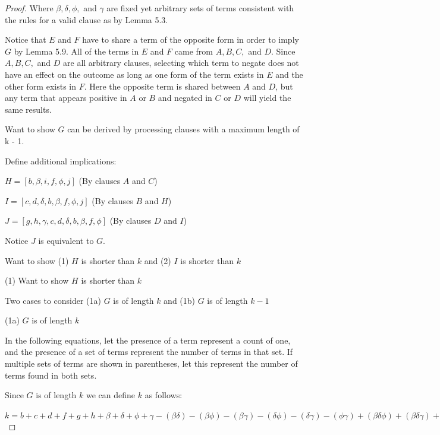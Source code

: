 \documentclass[manuscript]{acmart}
\begin{document}
\begin{proof}
        Where $\beta, \delta, \phi,$ and $\gamma$ are fixed yet arbitrary sets
        of terms consistent with the rules for a valid clause as by Lemma 5.3.

        Notice that $E$ and $F$ have to share a term of the opposite form
        in order to imply $G$ by Lemma 5.9. All of the terms in $E$ and $F$
        came from $A, B, C,$ and $D$.
        Since $A, B, C,$ and $D$ are
        all arbitrary clauses, selecting which term to negate does not
        have an effect on the outcome as long as one form of the term exists in $E$
        and the other form exists in $F$.
        Here the opposite term is shared 
        between $A$ and $D$, but any term that appears positive in $A$
        or $B$ and negated in $C$ or $D$ will yield the same results.
 
        Want to show $G$ can be derived by processing clauses with a 
        maximum length of k - 1.

        Define additional implications:

        $H = [b, \beta, i, f, \phi, j]$ (By clauses $A$ and $C$)

        $I = [c, d, \delta, b, \beta, f, \phi, j]$ (By clauses $B$ and $H$)

        $J = [g, h, \gamma, c, d, \delta, b, \beta, f, \phi]$ (By clauses $D$ and $I$)

        Notice $J$ is equivalent to $G$.

        Want to show (1) $H$ is shorter than $k$ and (2) $I$ is shorter than $k$

        (1) Want to show $H$ is shorter than $k$

        Two cases to consider (1a) $G$ is of length $k$ and (1b) $G$ is of length $k - 1$

        (1a) $G$ is of length $k$

        In the following equations, let the presence of a term represent a count of one,
        and the presence of a set of terms represent the number of terms in that set. If
        multiple sets of terms are shown in parentheses, let this represent the number
        of terms found in both sets.

        Since $G$ is of length $k$ we can define $k$ as follows:

        $k = b + c + d + f + g + h
            + \beta + \delta + \phi + \gamma
            - (\beta \delta) - (\beta \phi) - (\beta \gamma) - (\delta \phi) - (\delta \gamma) -(\phi \gamma)
            + (\beta \delta \phi) + (\beta \delta \gamma) + (\beta \phi \gamma) + (\delta \phi \gamma)
            - (\beta \delta \phi \gamma)
        $


\end{proof}
\end{document}
